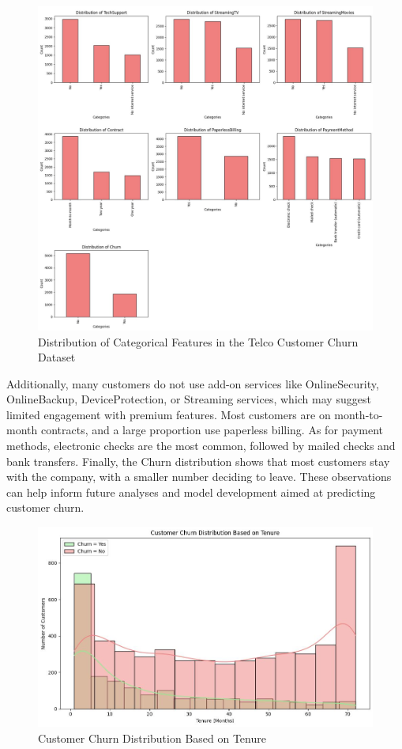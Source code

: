 \begin{figure}[hbt!]
    \centering
    \includegraphics[width=1\linewidth]{Images/2.3.c.jpg}
    \caption{Distribution of Categorical Features in the Telco Customer Churn Dataset }
    \label{fig:enter-label}
\end{figure}

Additionally, many customers do not use add-on services like OnlineSecurity, OnlineBackup, DeviceProtection, or Streaming services, which may suggest limited engagement with premium features. Most customers are on month-to-month contracts, and a large proportion use paperless billing. As for payment methods, electronic checks are the most common, followed by mailed checks and bank transfers. Finally, the Churn distribution shows that most customers stay with the company, with a smaller number deciding to leave. These observations can help inform future analyses and model development aimed at predicting customer churn.\\

\begin{figure}[hbt!]
    \centering
    \includegraphics[width=1\linewidth]{Images/2.3.d.jpg}
    \caption{Customer Churn Distribution Based on Tenure}
    \label{fig:enter-label}
\end{figure}

